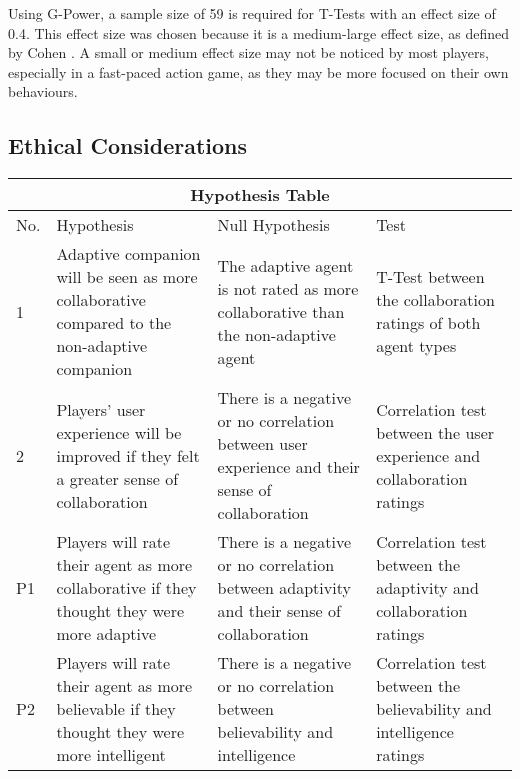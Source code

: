 \documentclass{IEEEtran}
\begin{document}
Using G-Power, a sample size of 59 is required for T-Tests with an effect size of 0.4. This effect size was chosen because it is a medium-large effect size, as defined by Cohen \cite{cohen1988statistical}. A small or medium effect size may not be noticed by most players, especially in a fast-paced action game, as they may be more focused on their own behaviours.


\subsection{Ethical Considerations}
\label{EthicalConsiderations}

\begin{table*}[t]
\centering
\begin{tabular}{ |p{0.3cm}|p{6cm}|p{6cm}|p{5cm}|  }
 \hline
 \multicolumn{4}{|c|}{Hypothesis Table} \\
 \hline
 No. & Hypothesis & Null Hypothesis & Test\\
 \hline
    1 & Adaptive companion will be seen as more collaborative compared to the non-adaptive companion & 
    The adaptive agent is not rated as more collaborative than the non-adaptive agent &
    T-Test between the collaboration ratings of both agent types \\
 \hline
    2 & Players' user experience will be improved if they felt a greater sense of collaboration & 
    There is a negative or no correlation between user experience and their sense of collaboration &
    Correlation test between the user experience and collaboration ratings\\
 \hline
    P1 & Players will rate their agent as more collaborative if they thought they were more adaptive & 
    There is a negative or no correlation between adaptivity and their sense of collaboration &
    Correlation test between the adaptivity and collaboration ratings\\
 \hline
    P2 & Players will rate their agent as more believable if they thought they were more intelligent & 
    There is a negative or no correlation between believability and intelligence &
    Correlation test between the believability and intelligence ratings\\
 \hline
\end{tabular}
\end{table*}
\end{document}
